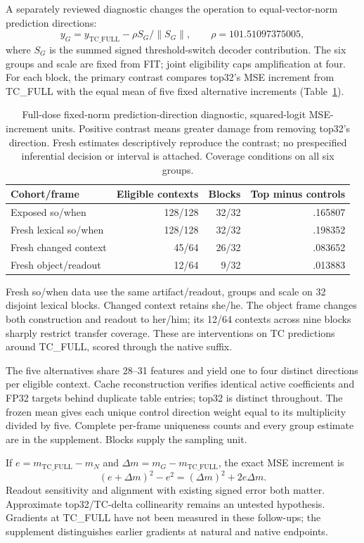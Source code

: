 \documentclass[11pt]{article}
\begin{document}
A separately reviewed diagnostic changes the operation to equal-vector-norm prediction directions:
\[
 y_G=y_{\mathrm{TC\_FULL}}-\rho S_G/\|S_G\|,
 \qquad \rho=101.51097375005,
\]
where $S_G$ is the summed signed threshold-switch decoder contribution. The six groups and scale are fixed from FIT; joint eligibility caps amplification at four. For each block, the primary contrast compares top32's MSE increment from TC\_FULL with the equal mean of five fixed alternative increments (Table~\ref{tab:norm}).

\begin{table}[ht]\centering\small
\begin{tabular}{lrrr}\toprule Cohort/frame & Eligible contexts & Blocks & Top minus controls\\\midrule
Exposed so/when & 128/128 & 32/32 & .165807\\
Fresh lexical so/when & 128/128 & 32/32 & .198352\\
Fresh changed context & 45/64 & 26/32 & .083652\\
Fresh object/readout & 12/64 & 9/32 & .013883\\\bottomrule\end{tabular}
\caption{Full-dose fixed-norm prediction-direction diagnostic, squared-logit MSE-increment units. Positive contrast means greater damage from removing top32's direction. Fresh estimates descriptively reproduce the contrast; no prespecified inferential decision or interval is attached. Coverage conditions on all six groups.}\label{tab:norm}
\end{table}

Fresh so/when data use the same artifact/readout, groups and scale on 32 disjoint lexical blocks. Changed context retains she/he. The object frame changes both construction and readout to her/him; its 12/64 contexts across nine blocks sharply restrict transfer coverage. These are interventions on TC predictions around TC\_FULL, scored through the native suffix.

The five alternatives share 28--31 features and yield one to four distinct directions per eligible context. Cache reconstruction verifies identical active coefficients and FP32 targets behind duplicate table entries; top32 is distinct throughout. The frozen mean gives each unique control direction weight equal to its multiplicity divided by five. Complete per-frame uniqueness counts and every group estimate are in the supplement. Blocks supply the sampling unit.

If $e=m_{\mathrm{TC\_FULL}}-m_N$ and $\Delta m=m_G-m_{\mathrm{TC\_FULL}}$, the exact MSE increment is
\[
 (e+\Delta m)^2-e^2=(\Delta m)^2+2e\Delta m.
\]
Readout sensitivity and alignment with existing signed error both matter. Approximate top32/TC-delta collinearity remains an untested hypothesis. Gradients at TC\_FULL have not been measured in these follow-ups; the supplement distinguishes earlier gradients at natural and native endpoints.
\end{document}

